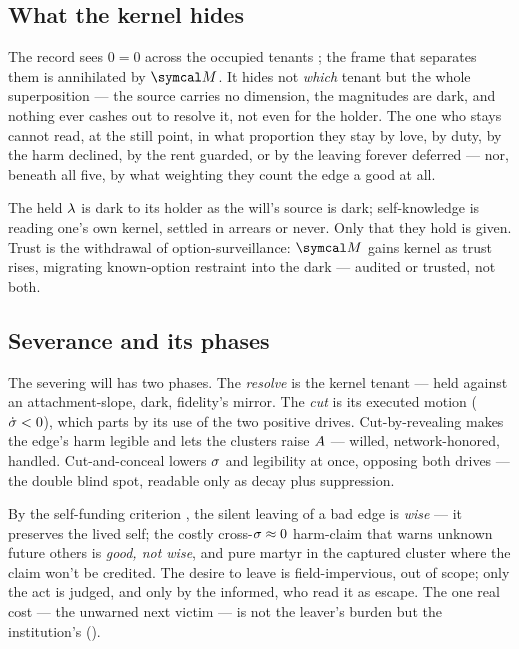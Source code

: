 \documentclass[../main]{subfiles}
\begin{document}
\subsection{What the kernel hides}
\label{subsec:still:hides}
%
The record sees $0=0$ across the occupied tenants ; the frame that separates them
is annihilated by $\readout$. It hides not \emph{which} tenant but the whole superposition ---
the source carries no dimension, the magnitudes are dark, and nothing ever cashes out to
resolve it, not even for the holder. The one who stays cannot read, at the still point, in
what proportion they stay by love, by duty, by the harm declined, by the rent guarded, or
by the leaving forever
deferred --- nor, beneath all five, by what weighting they count the edge a good at all.

The held $\lambda$ is dark to its holder as the will's source is dark; self-knowledge
is reading one's own kernel, settled in arrears or never. Only that they hold is given. Trust
is the withdrawal of option-surveillance: $\readout$ gains kernel as trust rises, migrating
known-option restraint into the dark --- audited or trusted, not both.

\subsection{Severance and its phases}
\label{subsec:still:severance}
%
The severing will has two phases. The \emph{resolve} is the kernel tenant  ---
held against an attachment-slope, dark, fidelity's mirror. The \emph{cut} is its executed
motion ($\dot{\sigma}<0$), which parts by its use of the two positive drives. Cut-by-revealing
makes the edge's harm legible and lets the clusters raise $A$ --- willed,
network-honored, handled. Cut-and-conceal lowers $\sigma$ and legibility at once, opposing
both drives --- the double blind spot, readable only as decay plus suppression.

By the self-funding criterion , the silent leaving of a bad edge is \emph{wise}
--- it preserves the lived self; the costly cross-$\sigma\approx0$ harm-claim that warns
unknown future others is \emph{good, not wise}, and pure martyr in the captured cluster where
the claim won't be credited. The desire to leave is field-impervious, out of scope; only the
act is judged, and only by the informed, who read it as escape. The one real cost --- the
unwarned next victim --- is not the leaver's burden but the institution's
().
\end{document}
